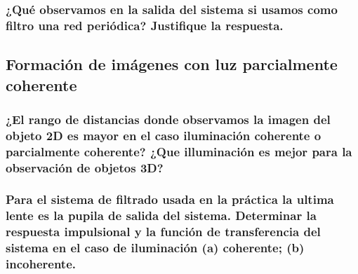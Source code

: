 \documentclass{./packages/optica-article}
\begin{document}
\subsubsection{¿Qué observamos en la salida del sistema si usamos como filtro una red periódica? Justifique la respuesta.}

\subsection{Formación de imágenes con luz parcialmente coherente}

\subsubsection{¿El rango de distancias donde observamos la imagen del objeto 2D es mayor en el caso iluminación coherente o parcialmente coherente? ¿Que illuminación es mejor para la observación de objetos 3D?}

\subsubsection{Para el sistema de filtrado usada en la práctica la ultima lente es la pupila de salida del sistema. Determinar la respuesta impulsional y la función de transferencia del sistema en el caso de iluminación (a) coherente; (b) incoherente.}

\end{document}
